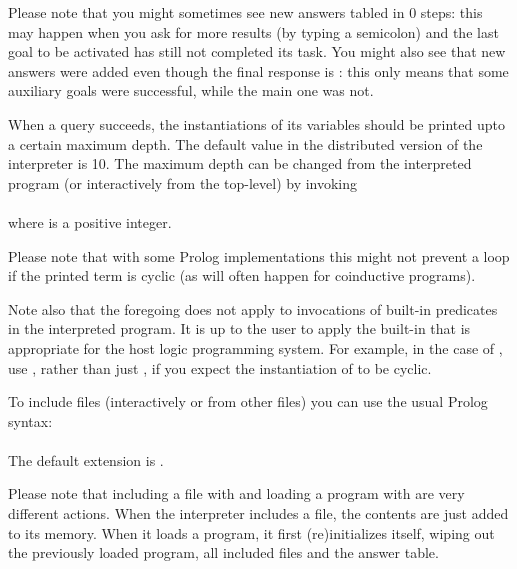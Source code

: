 Please note that you might sometimes see new answers tabled in 0 steps: this
may happen when you ask for more results (by typing a semicolon) and the last
goal to be activated has still not completed its task.  You might also see
that new answers were added even though the final response is : this
only means that some auxiliary goals were successful, while the main one was
not.


%

When a query succeeds, the instantiations of its variables should be printed
upto a certain maximum depth.  The default value in the distributed version
of the interpreter is 10.  The maximum depth can be changed from the
interpreted program (or interactively from the top-level) by invoking\\
\ind{}\\
where  is a positive integer.

Please note that with some Prolog implementations this might not prevent a
loop if the printed term is cyclic (as will often happen for coinductive
programs).

Note also that the foregoing does not apply to invocations of built-in
predicates in the interpreted program.  It is up to the user to apply the
built-in that is appropriate for the host logic programming system.  For
example, in the case of \Sicstus{}, use
, rather than just , if you expect the instantiation of  to be cyclic.




To include files (interactively or from other files) you can use the usual
Prolog syntax:\\
\ind
{}%
\label{dir:include}\\
The default extension is .%
%

Please note that including a file with   and
loading a program with  are very different
actions. When the interpreter includes a file, the contents are just
added to its memory. When it loads a program, it first (re)initializes
itself, wiping out the previously loaded program, all included files and the
answer table.



